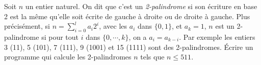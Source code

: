 Soit $n$ un entier naturel. On dit que c'est un \emph{2-palindrome} si son
écriture en base 2 est la même qu'elle soit écrite de gauche à droite ou de
droite à gauche. Plus précisément, si $n=\displaystyle\sum_{i=0}^l a_i2^i$,
avec les $a_i$ dans $\{0,1\}$, et $a_k=1$, $n$ est un 2-palindrome si pour tout
$i$ dans $\{0,\cdots,k\}$, on a $a_i=a_{k-i}$. Par exemple les entiers 3
(11), 5 (101), 7 (111), 9 (1001) et 15 (1111) sont des 2-palindromes. Écrire un
programme qui calcule les 2-palindromes $n$ tels que $n\leq 511$.